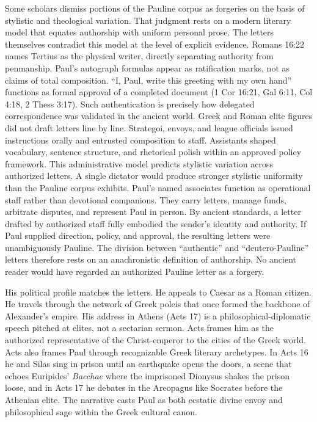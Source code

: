 Some scholars dismiss portions of the Pauline corpus as forgeries on the basis of stylistic and theological variation.
That judgment rests on a modern literary model that equates authorship with uniform personal prose.
The letters themselves contradict this model at the level of explicit evidence.
Romans 16:22 names Tertius as the physical writer, directly separating authority from penmanship.
Paul's autograph formulas appear as ratification marks, not as claims of total composition.
``I, Paul, write this greeting with my own hand'' functions as formal approval of a completed document (1 Cor 16:21, Gal 6:11, Col 4:18, 2 Thess 3:17).
Such authentication is precisely how delegated correspondence was validated in the ancient world.
Greek and Roman elite figures did not draft letters line by line.
Strategoi, envoys, and league officials issued instructions orally and entrusted composition to staff.
Assistants shaped vocabulary, sentence structure, and rhetorical polish within an approved policy framework.
This administrative model predicts stylistic variation across authorized letters.
A single dictator would produce stronger stylistic uniformity than the Pauline corpus exhibits.
Paul's named associates function as operational staff rather than devotional companions.
They carry letters, manage funds, arbitrate disputes, and represent Paul in person.
By ancient standards, a letter drafted by authorized staff fully embodied the sender's identity and authority.
If Paul supplied direction, policy, and approval, the resulting letters were unambiguously Pauline.
The division between ``authentic'' and ``deutero-Pauline'' letters therefore rests on an anachronistic definition of authorship.
No ancient reader would have regarded an authorized Pauline letter as a forgery.

His political profile matches the letters.
He appeals to Caesar as a Roman citizen.
He travels through the network of Greek poleis that once formed the backbone of Alexander's empire.
His address in Athens (Acts 17) is a philosophical-diplomatic speech pitched at elites, not a sectarian sermon.
Acts frames him as the authorized representative of the Christ-emperor to the cities of the Greek world.
Acts also frames Paul through recognizable Greek literary archetypes.
In Acts 16 he and Silas sing in prison until an earthquake opens the doors, a scene that echoes Euripides' \emph{Bacchae} where the imprisoned Dionysus shakes the prison loose, and in Acts 17 he debates in the Areopagus like Socrates before the Athenian elite.
The narrative casts Paul as both ecstatic divine envoy and philosophical sage within the Greek cultural canon.

